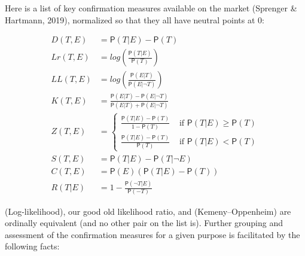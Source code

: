 \documentclass[
  10pt,
  dvipsnames,enabledeprecatedfontcommands]{scrartcl}
\newcommand{\n}{\neg}
\newcommand{\pr}[1]{\mathsf{P}(#1)}
\begin{document}
Here is a list of key confirmation measures available on the market
(Sprenger \& Hartmann, 2019), normalized so that they all have neutral
points at 0:

\begin{align}
\tag{Difference}  D(T,E) & = \pr{T\vert E} - \pr{T}\\
\tag{Log-ratio}  Lr(T,E) &  = log\left(\frac{\pr{T\vert E}}{\pr{T}} \right) \\
\tag{Log-likelihood}   LL(T,E) & = log\left(\frac{\pr{E \vert T}}{\pr{E \vert \n T}} \right)\\
\tag{Kemeny-Oppenheim}  K(T,E) & = \frac{\pr{E\vert T} - \pr{E \vert \n T}}{\pr{E \vert T} + \pr{E \vert \n T}} \\
\tag{Generalized entailment}  Z(T,E) & = \begin{cases}
\frac{\pr{T\vert E} - \pr{T}}{1-\pr{T}} & \mbox{ if } \pr{T \vert E} \geq \pr{T}\\
\frac{\pr{T\vert E} - \pr{T}}{\pr{T}} & \mbox{ if } \pr{T \vert E} < \pr{T}
\end{cases} \\
\tag{Christensen-Joyce} S(T,E) & = \pr{T \vert E} - \pr{T \vert \n E} \\
\tag{Carnap}  C(T,E) & = \pr{E}(\pr{T\vert E} - \pr{T})\\
\tag{Rips} R(T\vert E) & = 1 - \frac{\pr{\n T\vert E}}{\pr{-T}}
\end{align}

(Log-likelihood), our good old likelihood ratio, and (Kemeny--Oppenheim)
are ordinally equivalent (and no other pair on the list is). Further
grouping and assessment of the confirmation measures for a given purpose
is facilitated by the following facts:
\end{document}
